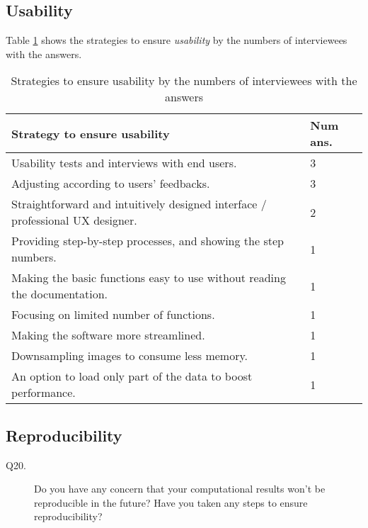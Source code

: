 \subsection{Usability}
\label{sec_interview_usability}

Table \ref{tab_q18_strategies_usability} shows the strategies to ensure \textit{usability} by the numbers of interviewees with the answers.

\begin{table}[H]
\centering
\begin{tabular}{ll}
\hline
Strategy to ensure usability & Num ans. \\ \hline
Usability tests and interviews with end users. & 3 \\
Adjusting according to users' feedbacks. & 3 \\
Straightforward and intuitively designed interface / professional UX designer. & 2 \\
Providing step-by-step processes, and showing the step numbers. & 1 \\
Making the basic functions easy to use without reading the documentation. & 1 \\
Focusing on limited number of functions. & 1 \\
Making the software more streamlined. & 1 \\
Downsampling images to consume less memory. & 1 \\
An option to load only part of the data to boost performance. & 1 \\ \hline
\end{tabular}
\caption{\label{tab_q18_strategies_usability}Strategies to ensure usability by the numbers of interviewees with the answers}
\end{table}

\subsection{Reproducibility}
\label{sec_interview_reproducibility}
\begin{description}
\item[Q20.] Do you have any concern that your computational results won’t be reproducible in the future? Have you taken any steps to ensure reproducibility?
\end{description}

